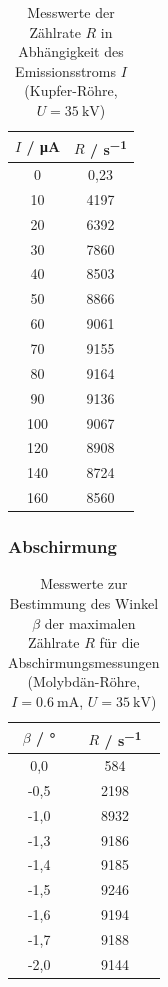\documentclass{article}
\begin{document}
\begin{table}[H]
    \centering
    \caption{Messwerte der Zählrate $R$ in Abhängigkeit des Emissionsstroms $I$ (Kupfer-Röhre, $U = \SI{35}{\kilo\volt}$)}
    \begin{tabular}{|c|c|}
        \hline
        $I$ / \si{\micro \ampere} & $R$ / \si{\second \tothe{-1}} \\ \hline \hline
         0 & 0,23 \\ \hline
         10 & 4197 \\ \hline
         20 & 6392 \\ \hline
         30 & 7860 \\ \hline
         40 & 8503 \\ \hline
         50 & 8866 \\ \hline
         60 & 9061 \\ \hline
         70 & 9155 \\ \hline
         80 & 9164 \\ \hline
         90 & 9136 \\ \hline
         100 & 9067 \\ \hline
         120 & 8908 \\ \hline
         140 & 8724 \\ \hline
         160 & 8560 \\ \hline
    \end{tabular}
    \label{tab:MesswerteTotzeitStrom}
\end{table}

\subsubsection{Abschirmung}

\begin{table}[H]
    \centering
    \caption{Messwerte zur Bestimmung des Winkel $\beta$ der maximalen Zählrate $R$ für die Abschirmungsmessungen (Molybdän-Röhre, $I = \SI{0,6}{\milli\ampere}$, $U = \SI{35}{\kilo\volt}$)}
    \begin{tabular}{|c|c|}
        \hline
        $\beta$ / \si{\degree} & $R$ / \si{\second \tothe{-1}} \\ \hline \hline
         0,0 & 584 \\ \hline
         -0,5 & 2198 \\ \hline
         -1,0 & 8932 \\ \hline
         -1,3 & 9186 \\ \hline
         -1,4 & 9185 \\ \hline
         -1,5 & 9246 \\ \hline
         -1,6 & 9194 \\ \hline
         -1,7 & 9188 \\ \hline
         -2,0 & 9144 \\ \hline
    \end{tabular}
    \label{tab:MesswerteAbschirmungWinkel}
\end{table}
\end{document}
